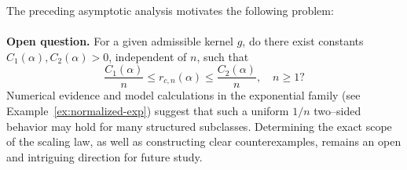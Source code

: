 \documentclass[12pt,a4paper]{amsart}
\numberwithin{equation}{section}
\theoremstyle{remark}
\begin{document}
The preceding asymptotic analysis motivates the following problem:\\\\
\noindent\textbf{Open question.}
For a given admissible kernel \(g\), do there exist constants \(C_1(\alpha),C_2(\alpha)>0\), independent of \(n\), such that
\[
\frac{C_1(\alpha)}{n}\le r_{c,n}(\alpha)\le\frac{C_2(\alpha)}{n}, \quad n\ge1?
\]
Numerical evidence and model calculations in the exponential family (see Example~\ref{ex:normalized-exp}) suggest that such a uniform \(1/n\) two–sided behavior may hold for many structured subclasses.  
Determining the exact scope of the scaling law, as well as constructing clear counterexamples, remains an open and intriguing direction for future study. 








\end{document}
